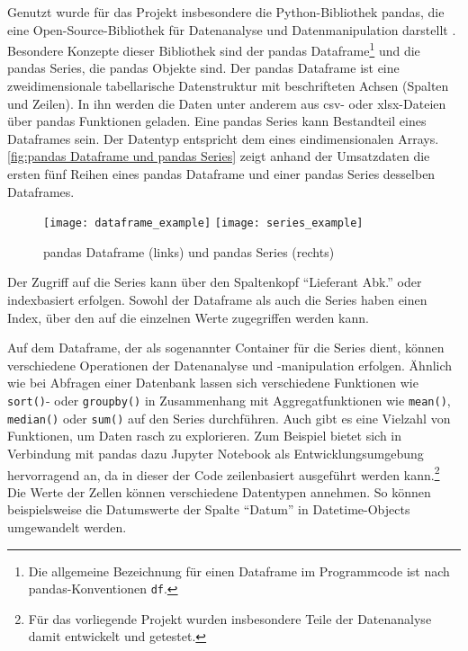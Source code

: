     Genutzt wurde für das Projekt insbesondere die Python-Bibliothek pandas, die eine Open-Source-Bibliothek für Datenanalyse und 
    Datenmanipulation darstellt \cite[vgl.][]{pandas_pandas_2021}. 
    Besondere Konzepte dieser Bibliothek sind der pandas Dataframe\footnote{Die allgemeine Bezeichnung für einen Dataframe im Programmcode ist nach pandas-Konventionen \texttt{df}.} und die pandas Series, die pandas Objekte sind. Der pandas Dataframe ist eine zweidimensionale 
    tabellarische Datenstruktur mit beschrifteten Achsen (Spalten und Zeilen). In ihn
    werden die Daten unter anderem aus csv- oder xlsx-Dateien über pandas Funktionen geladen.
    Eine pandas Series kann Bestandteil eines Dataframes sein. Der Datentyp entspricht dem eines eindimensionalen Arrays. 
    \autoref{fig:pandas Dataframe und pandas Series} zeigt anhand der Umsatzdaten die ersten fünf Reihen
    eines pandas Dataframe und einer pandas Series desselben Dataframes. 
    
    
    \begin{figure}[H]
        \centering
            \texttt{[image: dataframe\_example]}
            \hspace{1cm}
            \texttt{[image: series\_example]}
            \caption{pandas Dataframe (links) und pandas Series (rechts)}
            \label{fig:pandas Dataframe und pandas Series}
    \end{figure}

    Der Zugriff auf die Series kann über den Spaltenkopf \enquote{Lieferant Abk.} oder indexbasiert erfolgen. 
    Sowohl der Dataframe als auch die Series haben einen Index, über den auf die einzelnen Werte zugegriffen werden kann. 
    
    Auf dem Dataframe, der als sogenannter Container für die Series dient, können verschiedene Operationen der Datenanalyse und 
    -manipulation erfolgen. Ähnlich wie bei Abfragen einer Datenbank lassen sich verschiedene Funktionen wie \texttt{sort()}- oder \texttt{groupby()}
    in Zusammenhang mit Aggregatfunktionen wie \texttt{mean()}, \texttt{median()} oder \texttt{sum()} auf den Series durchführen.
    Auch gibt es eine Vielzahl von Funktionen, um Daten rasch zu explorieren. Zum Beispiel bietet sich in Verbindung mit pandas dazu Jupyter Notebook als
    Entwicklungsumgebung hervorragend an, da in dieser der Code zeilenbasiert ausgeführt werden kann.\footnote{Für das vorliegende Projekt wurden 
    insbesondere Teile der Datenanalyse damit entwickelt und getestet.} Die Werte der Zellen können verschiedene Datentypen
    annehmen. So können beispielsweise die Datumswerte der Spalte \enquote{Datum} in Datetime-Objects umgewandelt werden.

